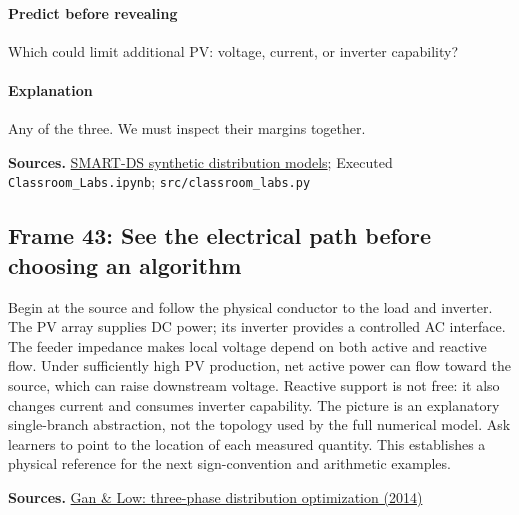 \documentclass[11pt]{article}
\begin{document}
\paragraph{Predict before revealing}Which could limit additional PV: voltage, current, or inverter capability?
\paragraph{Explanation}Any of the three. We must inspect their margins together.
\par\nopagebreak\begin{minipage}{\linewidth}{\footnotesize\color{slate}\textbf{Sources.} \href{https://data.openei.org/submissions/2981}{SMART-DS synthetic distribution models}; Executed \texttt{Classroom\_Labs.ipynb}; \texttt{src/classroom\_labs.py}\par}\end{minipage}\par\medskip
\subsection*{Frame 43: See the electrical path before choosing an algorithm}
Begin at the source and follow the physical conductor to the load and inverter. The PV array supplies DC power; its inverter provides a controlled AC interface. The feeder impedance makes local voltage depend on both active and reactive flow. Under sufficiently high PV production, net active power can flow toward the source, which can raise downstream voltage. Reactive support is not free: it also changes current and consumes inverter capability. The picture is an explanatory single-branch abstraction, not the topology used by the full numerical model. Ask learners to point to the location of each measured quantity. This establishes a physical reference for the next sign-convention and arithmetic examples.\par
\par\nopagebreak\begin{minipage}{\linewidth}{\footnotesize\color{slate}\textbf{Sources.} \href{https://arxiv.org/abs/1406.3054}{Gan \& Low: three-phase distribution optimization (2014)}\par}\end{minipage}\par\medskip
\end{document}
